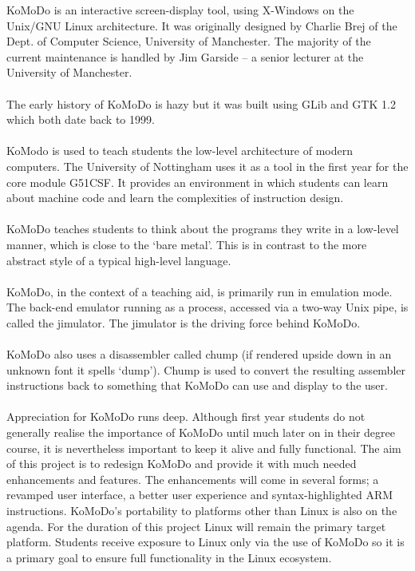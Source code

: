 KoMoDo is an interactive screen-display tool, using X-Windows on the Unix/GNU Linux architecture. It was originally designed by Charlie Brej of the Dept. of Computer Science, University of Manchester. The majority of the current maintenance is handled by Jim Garside -- a senior lecturer at the University of Manchester.\\\\
%
The early history of KoMoDo is hazy but it was built using GLib and GTK 1.2 which both date back to 1999.\\\\
%
KoModo is used to teach students the low-level architecture of modern computers. The University of Nottingham uses it as a tool in the first year for the core module G51CSF. It provides an environment in which students can learn about machine code and learn the complexities of instruction design.\\\\
%
KoMoDo teaches students to think about the programs they write in a low-level manner, which is close to the `bare metal'. This is in contrast to the more abstract style of a typical high-level language.\\\\
%
KoMoDo, in the context of a teaching aid, is primarily run in emulation mode. The back-end emulator running as a process, accessed via a two-way Unix pipe, is called the jimulator. The jimulator is the driving force behind KoMoDo.\\\\
%
KoMoDo also uses a disassembler called chump (if rendered upside down in an unknown font it spells `dump'). Chump is used to convert the resulting assembler instructions back to something that KoMoDo can use and display to the user.\\\\
%
Appreciation for KoMoDo runs deep. Although first year students do not generally realise the importance of KoMoDo until much later on in their degree course, it is nevertheless  important to keep it alive and fully functional.
%
The aim of this project is to redesign KoMoDo and provide it with much needed enhancements and features. The enhancements will come in several forms; a revamped user interface, a better user experience and syntax-highlighted ARM instructions. KoMoDo's portability to platforms other than Linux is also on the agenda. For the duration of this project Linux will remain the primary target platform. Students receive exposure to Linux only via the use of KoMoDo so it is a primary goal to ensure full functionality in the Linux ecosystem.
